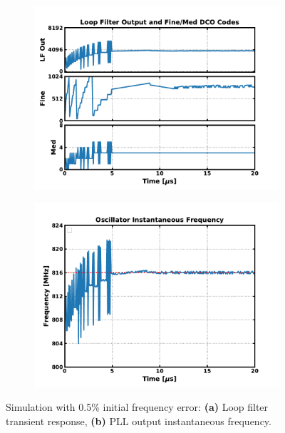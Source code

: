 			\begin{figure}[htb!]
			    \centering
			    \begin{subfigure}{0.5\textwidth}
			        \centering
			        \center\includegraphics[width=1.0\textwidth, angle=0]{figs/design/lf_dco_out}
			        \caption{ }
			        \label{fig:trans_det_fast}
			    \end{subfigure}%
			    \begin{subfigure}{0.5\textwidth}
			        \centering
			        \center\includegraphics[width=1.0\textwidth, angle=0]{figs/design/pipll_freq}
			        \caption{ }
			        \label{fig:trans_inst_freq_fast}
			    \end{subfigure}
			    \label{fig:trans_sim1_fast}
			    \caption{Simulation with 0.5\% initial frequency error: \textbf{(a)} Loop filter transient response, \textbf{(b)} PLL output instantaneous frequency.}
			\end{figure}

